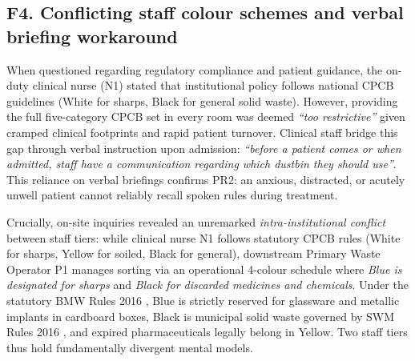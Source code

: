 \documentclass[10pt,twocolumn,a4paper]{article}
\newcommand{\quoteS}[1]{\textit{``#1''}}
\begin{document}
\subsection{F4. Conflicting staff colour schemes and verbal briefing workaround}
When questioned regarding regulatory compliance and patient guidance, the on-duty clinical nurse (N1) stated that institutional policy follows national CPCB guidelines (White for sharps, Black for general solid waste). However, providing the full five-category CPCB set in every room was deemed \quoteS{too restrictive} given cramped clinical footprints and rapid patient turnover. Clinical staff bridge this gap through verbal instruction upon admission: \quoteS{before a patient comes or when admitted, staff have a communication regarding which dustbin they should use}. This reliance on verbal briefings confirms PR2: an anxious, distracted, or acutely unwell patient cannot reliably recall spoken rules during treatment.

Crucially, on-site inquiries revealed an unremarked \emph{intra-institutional conflict} between staff tiers: while clinical nurse N1 follows statutory CPCB rules (White for sharps, Yellow for soiled, Black for general), downstream Primary Waste Operator P1 manages sorting via an operational 4-colour schedule where \emph{Blue is designated for sharps} and \emph{Black for discarded medicines and chemicals}. Under the statutory BMW Rules 2016 \cite{bmw2016}, Blue is strictly reserved for glassware and metallic implants in cardboard boxes, Black is municipal solid waste governed by SWM Rules 2016 \cite{swm2016}, and expired pharmaceuticals legally belong in Yellow. Two staff tiers thus hold fundamentally divergent mental models.
\end{document}
